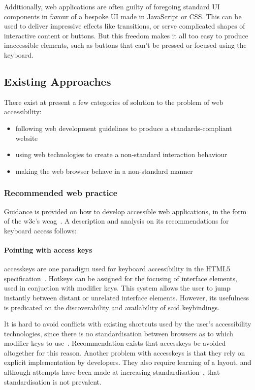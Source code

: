 \documentclass[a4paper, 11pt]{article}
\begin{document}
Additionally, web applications are often guilty of foregoing standard UI components in favour of a bespoke UI made in JavaScript or CSS. This can be used to deliver impressive effects like transitions, or serve complicated shapes of interactive content or buttons. But this freedom makes it all too easy to produce inaccessible elements, such as buttons that can't be pressed or focused using the keyboard.

\subsection{Existing Approaches}
There exist at present a few categories of solution to the problem of web accessibility:
\begin{itemize}
\item following web development guidelines to produce a standards-compliant website
\item using web technologies to create a non-standard interaction behaviour
\item making the web browser behave in a non-standard manner
\end{itemize}
\subsubsection{Recommended web practice}
\label{recommendedpracticesection}
Guidance is provided on how to develop accessible web applications, in the form of the \gls{w3c}'s \gls{wcag}~\cite{wcag}. A description and analysis on its recommendations for keyboard access follows:
\paragraph{Pointing with access keys}
\label{accesskeysection}
  \Gls{accesskeys} are one paradigm used for keyboard accessibility in the HTML5 specification~\cite{html5specaccesskeys}. Hotkeys can be assigned for the focusing of interface elements, used in conjuction with modifier keys. This system allows the user to jump instantly between distant or unrelated interface elements. However, its usefulness is predicated on the discoverability and availability of said \glspl{keybinding}.

  It is hard to avoid conflicts with existing shortcuts used by the user's accessibility technologies, since there is no standardisation between browsers as to which modifier keys to use~\cite{webaimaccesskeys}. Recommendation exists that \gls{accesskeys} be avoided altogether for this reason. Another problem with \gls{accesskeys} is that they rely on explicit implementation by developers. They also require learning of a layout, and although attempts have been made at increasing standardisation~\cite{AccesskeyStandardisation}, that standardisation is not prevalent.
\end{document}
